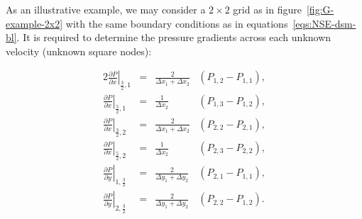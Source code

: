 \documentclass{article}
\begin{document}
As an illustrative example, we may consider a $2\times 2$ grid as in figure~\ref{fig:G-example-2x2} with the same boundary conditions as in equations~\eqref{eqs:NSE-dsm-bl}. It is required to determine the pressure gradients across each unknown velocity (unknown square nodes):

\begin{alignat*}{2}
	\left.\frac{\partial P}{\partial x}\right|_{\frac{3}{2},1} &=&	\frac{2}{{\Delta x_1 + \Delta x_2}}&\left(P_{1,2}-P_{1,1}\right),\\
	\left.\frac{\partial P}{\partial x}\right|_{\frac{5}{2},1} &=&	\frac{1}{{\Delta x_2}}&\left( P_{1,3}-P_{1,2}\right),\\
	\left.\frac{\partial P}{\partial x}\right|_{\frac{3}{2},2} &=&	\frac{2}{{\Delta x_1 + \Delta x_2}}&\left( P_{2,2}-P_{2,1} \right),\\
	\left.\frac{\partial P}{\partial x}\right|_{\frac{5}{2},2} &=&	\frac{1}{{\Delta x_2}}&\left( P_{2,3}-P_{2,2} \right),\\
	\left.\frac{\partial P}{\partial y}\right|_{1,\frac{3}{2}} &=&	\frac{2}{{\Delta y_1 + \Delta y_2}}&\left(P_{2,1}-P_{1,1} \right),\\
	\left.\frac{\partial P}{\partial y}\right|_{2,\frac{3}{2}} &=&	\frac{2}{{\Delta y_1 + \Delta y_2}}&\left( P_{2,2}-P_{1,2} \right).
\end{alignat*}
\end{document}
